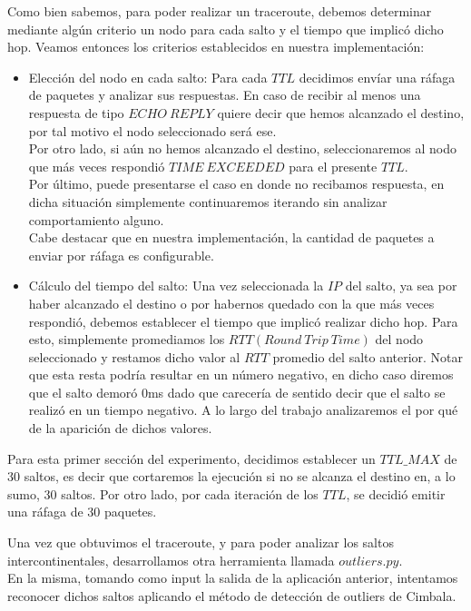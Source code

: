 Como bien sabemos, para poder realizar un traceroute, debemos determinar mediante algún criterio un nodo para cada salto y el tiempo que implicó dicho hop.
Veamos entonces los criterios establecidos en nuestra implementación:
\begin{itemize}
	\item Elección del nodo en cada salto: Para cada $TTL$ decidimos envíar una ráfaga de paquetes y analizar sus respuestas. En caso de recibir al menos una respuesta de tipo $ECHO\ REPLY$ quiere decir que hemos alcanzado el destino, por tal motivo el nodo seleccionado será ese. \\
Por otro lado, si aún no hemos alcanzado el destino, seleccionaremos al nodo que más veces respondió $TIME\ EXCEEDED$ para el presente $TTL$.\\
Por último, puede presentarse el caso en donde no recibamos respuesta, en dicha situación simplemente continuaremos iterando sin analizar comportamiento alguno. \\
Cabe destacar que en nuestra implementación, la cantidad de paquetes a enviar por ráfaga es configurable.
	\item Cálculo del tiempo del salto: Una vez seleccionada la $IP$ del salto, ya sea por haber alcanzado el destino o por habernos quedado con la que más veces respondió, debemos establecer el tiempo que implicó realizar dicho hop. Para esto, simplemente promediamos los $RTT (Round\ Trip\ Time)$ del nodo seleccionado y restamos dicho valor al $RTT$ promedio del salto anterior. Notar que esta resta podría resultar en un número negativo, en dicho caso diremos que el salto demoró 0ms dado que carecería de sentido decir que el salto se realizó en un tiempo negativo. A lo largo del trabajo analizaremos el por qué de la aparición de dichos valores.
\end{itemize}

Para esta primer sección del experimento, decidimos establecer un $TTL\_MAX$ de 30 saltos, es decir que cortaremos la ejecución si no se alcanza el destino en, a lo sumo, 30 saltos. Por otro lado, por cada iteración de los $TTL$, se decidió emitir una ráfaga de 30 paquetes.

Una vez que obtuvimos el traceroute, y para poder analizar los saltos intercontinentales, desarrollamos otra herramienta llamada $outliers.py$. \\
En la misma, tomando como input la salida de la aplicación anterior, intentamos reconocer dichos saltos aplicando el método de detección de outliers de Cimbala. 

